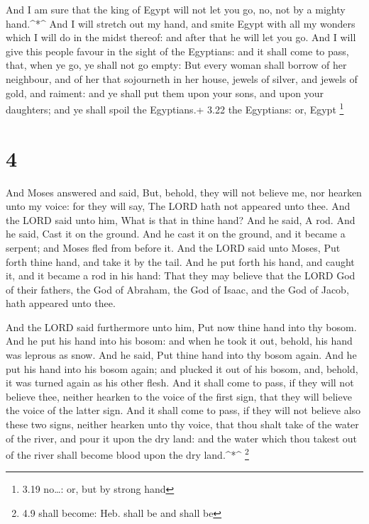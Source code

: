  And I am sure that the king of Egypt will not let you go,
no, not by a mighty hand.\^{}*\^{}  And I will stretch out
my hand, and smite Egypt with all my wonders which I will do in the
midst thereof: and after that he will let you go.  And I
will give this people favour in the sight of the Egyptians: and it shall
come to pass, that, when ye go, ye shall not go empty:  But
every woman shall borrow of her neighbour, and of her that sojourneth in
her house, jewels of silver, and jewels of gold, and raiment: and ye
shall put them upon your sons, and upon your daughters; and ye shall
spoil the Egyptians.+ 3.22 the Egyptians: or, Egypt \footnote{3.19
  no\ldots: or, but by strong hand}

\hypertarget{section-3}{%
\section{4}\label{section-3}}

 And Moses answered and said, But, behold, they will not
believe me, nor hearken unto my voice: for they will say, The LORD hath
not appeared unto thee.  And the LORD said unto him, What is
that in thine hand? And he said, A rod.  And he said, Cast
it on the ground. And he cast it on the ground, and it became a serpent;
and Moses fled from before it.  And the LORD said unto
Moses, Put forth thine hand, and take it by the tail. And he put forth
his hand, and caught it, and it became a rod in his hand: 
That they may believe that the LORD God of their fathers, the God of
Abraham, the God of Isaac, and the God of Jacob, hath appeared unto
thee.

 And the LORD said furthermore unto him, Put now thine hand
into thy bosom. And he put his hand into his bosom: and when he took it
out, behold, his hand was leprous as snow.  And he said, Put
thine hand into thy bosom again. And he put his hand into his bosom
again; and plucked it out of his bosom, and, behold, it was turned again
as his other flesh.  And it shall come to pass, if they will
not believe thee, neither hearken to the voice of the first sign, that
they will believe the voice of the latter sign.  And it
shall come to pass, if they will not believe also these two signs,
neither hearken unto thy voice, that thou shalt take of the water of the
river, and pour it upon the dry land: and the water which thou takest
out of the river shall become blood upon the dry land.\^{}*\^{}
\footnote{4.9 shall become: Heb. shall be and shall be}

